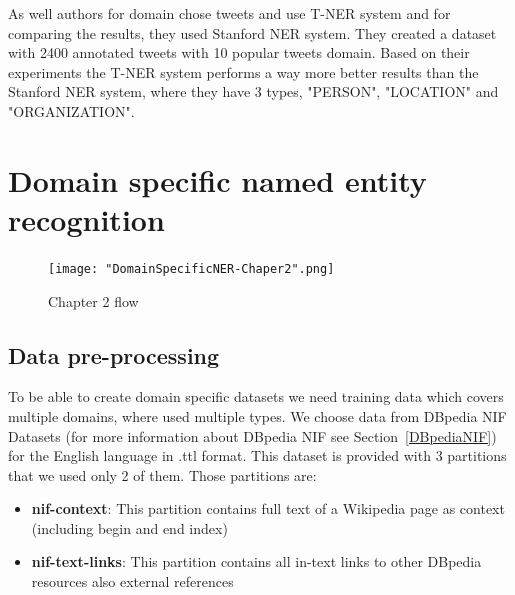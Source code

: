 \documentclass[thesis=M,english]{FITthesis}[2018/05/30]
\begin{document}
 As well \cite{RelatedWork:Tweets} authors for domain chose tweets and use T-NER system and for comparing the results, they used Stanford NER system. They created a dataset with 2400 annotated tweets with 10 popular tweets domain. Based on their experiments the T-NER system performs a way more better results than the Stanford NER system, where they have 3 types, "PERSON", "LOCATION" and "ORGANIZATION". 


\chapter{Domain specific named entity recognition}\label{}
\begin{figure}
\texttt{[image: "DomainSpecificNER-Chaper2".png]}
		\caption{Chapter 2 flow}\label{}
\end{figure}	

\section{Data pre-processing}\label{dataPreProcessing}
	To be able to create domain specific datasets we need training data which covers multiple domains, where used multiple types. We choose data from DBpedia NIF Datasets (for more information about DBpedia NIF see Section~\ref{DBpediaNIF}) for the English language in .ttl format. This dataset is provided with 3 partitions that we used only 2 of them. Those partitions are:
	\begin{itemize}
		\item \textbf{nif-context}: This partition contains full text of a Wikipedia page as context (including begin and end index)
		\item \textbf{nif-text-links}: This partition contains all in-text links to other DBpedia resources also external references
	\end{itemize}	 
\end{document}
